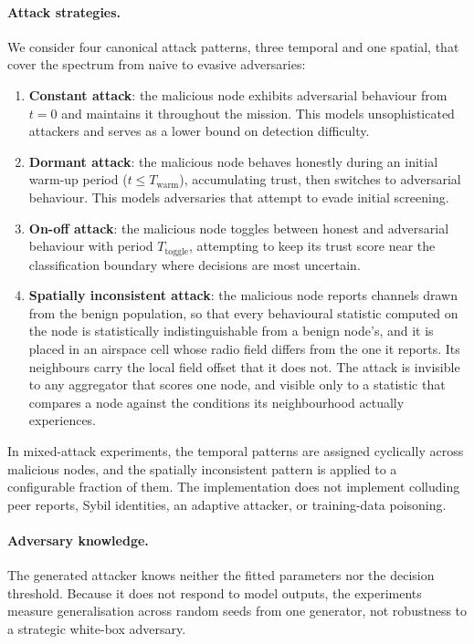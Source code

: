 \documentclass[notspecified,article,submit,moreauthors]{Definitions/mdpi}
\begin{document}
\paragraph{Attack strategies.}
We consider four canonical attack patterns, three temporal and one spatial, that cover the spectrum from naive to evasive adversaries:
\begin{enumerate}[label={(\roman*)}]
    \item \textbf{Constant attack}: the malicious node exhibits adversarial behaviour from $t = 0$ and maintains it throughout the mission. This models unsophisticated attackers and serves as a lower bound on detection difficulty.
    \item \textbf{Dormant attack}: the malicious node behaves honestly during an initial warm-up period ($t \leq T_{\text{warm}}$), accumulating trust, then switches to adversarial behaviour. This models adversaries that attempt to evade initial screening.
    \item \textbf{On-off attack}: the malicious node toggles between honest and adversarial behaviour with period $T_{\text{toggle}}$, attempting to keep its trust score near the classification boundary where decisions are most uncertain.
    \item \textbf{Spatially inconsistent attack}: the malicious node reports channels drawn from the benign population, so that every behavioural statistic computed on the node is statistically indistinguishable from a benign node's, and it is placed in an airspace cell whose radio field differs from the one it reports. Its neighbours carry the local field offset that it does not. The attack is invisible to any aggregator that scores one node, and visible only to a statistic that compares a node against the conditions its neighbourhood actually experiences.
\end{enumerate}
In mixed-attack experiments, the temporal patterns are assigned cyclically across malicious nodes, and the spatially inconsistent pattern is applied to a configurable fraction of them. The implementation does not implement colluding peer reports, Sybil identities, an adaptive attacker, or training-data poisoning.

\paragraph{Adversary knowledge.}
The generated attacker knows neither the fitted parameters nor the decision threshold. Because it does not respond to model outputs, the experiments measure generalisation across random seeds from one generator, not robustness to a strategic white-box adversary.
\end{document}

